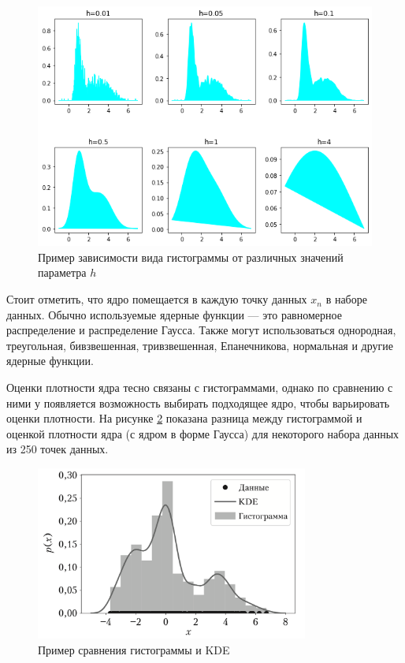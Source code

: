 \begin{figure}[H]
	\centering
	\includegraphics[width=\textwidth]{assets/kde-h.png}
	\caption{Пример зависимости вида гистограммы от различных значений параметра $h$}
	\label{fig:kde-h}
\end{figure}

Стоит отметить, что ядро помещается в каждую точку данных $x_n$ в наборе данных. Обычно используемые ядерные функции --- это равномерное распределение и распределение Гаусса. Также могут использоваться однородная, треугольная, бивзвешенная, тривзвешенная, Епанечникова, нормальная и другие ядерные функции.~\cite{math}

Оценки плотности ядра тесно связаны с гистограммами, однако по сравнению с ними у появляется возможность выбирать подходящее ядро, чтобы варьировать оценки плотности. На рисунке \ref{fig:kde} показана разница между гистограммой и оценкой плотности ядра (с ядром в форме Гаусса) для некоторого набора данных из 250 точек данных.~\cite{math}

\begin{figure}[H]
	\centering
	\includegraphics[width=0.8\textwidth]{assets/kde.png}
	\caption{Пример сравнения гистограммы и KDE}
	\label{fig:kde}
\end{figure}



